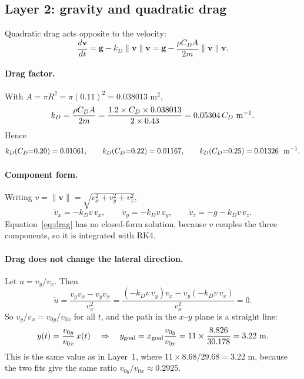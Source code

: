 \documentclass[11pt,a4paper]{article}
\begin{document}
\subsection{Layer 2: gravity and quadratic drag}
Quadratic drag acts opposite to the velocity:
\begin{equation}
    \frac{d\bm v}{dt}
    =\bm g-k_D\|\bm v\|\bm v
    =\bm g-\frac{\rho C_D A}{2m}\|\bm v\|\bm v.
    \label{eq:drag}
\end{equation}

\paragraph{Drag factor.}
With $A=\pi R^2=\pi(0.11)^2=0.038013$ m$^2$,
\begin{equation}
    k_D=\frac{\rho C_D A}{2m}=\frac{1.2\times C_D\times0.038013}{2\times0.43}
    =0.05304\,C_D\ {\rm m^{-1}}.
\end{equation}
Hence
\begin{equation}
    k_D(C_D{=}0.20)=0.01061,\qquad
    k_D(C_D{=}0.22)=0.01167,\qquad
    k_D(C_D{=}0.25)=0.01326\ \ {\rm m^{-1}}.
\end{equation}

\paragraph{Component form.}
Writing $v=\|\bm v\|=\sqrt{v_x^2+v_y^2+v_z^2}$,
\begin{equation}
    \dot v_x=-k_D v\,v_x,\qquad
    \dot v_y=-k_D v\,v_y,\qquad
    \dot v_z=-g-k_D v\,v_z .
\end{equation}
Equation~\eqref{eq:drag} has no closed-form solution, because $v$ couples the three components, so it is integrated with RK4.

\paragraph{Drag does not change the lateral direction.}
Let $u=v_y/v_x$. Then
\begin{equation}
    \dot u=\frac{\dot v_y v_x-v_y\dot v_x}{v_x^2}
    =\frac{(-k_Dv\,v_y)v_x-v_y(-k_Dv\,v_x)}{v_x^2}=0 .
\end{equation}
So $v_y/v_x=v_{0y}/v_{0x}$ for all $t$, and the path in the $x$--$y$ plane is a straight line:
\begin{equation}
    y(t)=\frac{v_{0y}}{v_{0x}}\,x(t)
    \quad\Rightarrow\quad
    y_{\rm goal}=x_{\rm goal}\frac{v_{0y}}{v_{0x}}=11\times\frac{8.826}{30.178}=3.22\ {\rm m}.
\end{equation}
This is the same value as in Layer~1, where $11\times8.68/29.68=3.22$ m, because the two fits give the same ratio $v_{0y}/v_{0x}\approx0.2925$.
\end{document}
